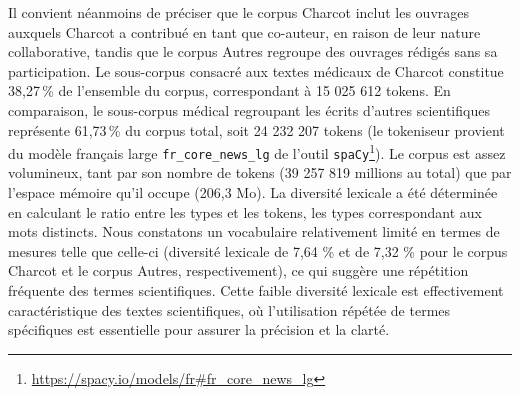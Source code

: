 Il convient néanmoins de préciser que le corpus Charcot inclut les ouvrages auxquels Charcot a contribué en tant que co-auteur, en raison de leur nature collaborative, tandis que le corpus Autres regroupe des ouvrages rédigés sans sa participation. Le sous-corpus consacré aux textes médicaux de Charcot constitue 38,27 \% de l’ensemble du corpus, correspondant à 15 025 612 tokens. En comparaison, le sous-corpus médical regroupant les écrits d'autres scientifiques représente 61,73 \% du corpus total, soit 24 232 207 tokens (le tokeniseur provient du modèle français large \texttt{fr\_core\_news\_lg} de l'outil \texttt{spaCy}\footnote{\url{https://spacy.io/models/fr\#fr_core_news_lg}}). Le corpus est assez volumineux, tant par son nombre de tokens (39 257 819 millions au total) que par l'espace mémoire qu'il occupe (206,3 Mo). La diversité lexicale a été déterminée en calculant le ratio entre les types et les tokens, les types correspondant aux mots distincts. Nous constatons un vocabulaire relativement limité en termes de mesures telle que celle-ci (diversité lexicale de 7,64 \% et de 7,32 \% pour le corpus Charcot et le corpus Autres, respectivement), ce qui suggère une répétition fréquente des termes scientifiques. Cette faible diversité lexicale est effectivement caractéristique des textes scientifiques, où l'utilisation répétée de termes spécifiques est essentielle pour assurer la précision et la clarté.



